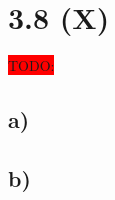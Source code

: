 \documentclass{article}
\begin{document}
\section*{3.8 (X)}
\colorbox{red}{TODO:}
\subsection*{a)}

\subsection*{b)}
\end{document}

